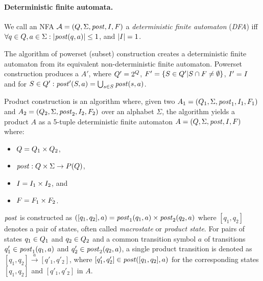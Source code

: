 
\paragraph{Deterministic finite automata.}
We call an NFA $\mathcal{A} = (Q, \Sigma
, \mathit{post}, I, F)$ a \emph{deterministic finite automaton} (\emph{DFA}) iff $\forall q \in Q, a \in \Sigma: |\mathit{post}(q, a)| \leq 1
$, and $|I| = 1$.

\begin{definition} \hfill \newline
    The algorithm of powerset (subset) construction creates a deterministic finite automaton from its equivalent non-deterministic finite automaton. Powerset construction produces a \dfa $A'$, where $Q' = 2^Q$, $F' = \{S \in Q' | S \cap F \neq \emptyset\}$, $I' = I$ and for $S \in Q': \mathit{post}'(S, a) = \bigcup_{s \in S} \mathit{post}(s, a)$.
\end{definition}

\begin{definition} \hfill \newline
Product construction is an algorithm where, given two \nfas $A_1 = (Q_1, \Sigma, \mathit{post}_1, I_1, F_1)$ and $A_2 = (Q_2, \Sigma, \mathit{post}_2, I_2, F_2)$ over an alphabet $\Sigma$, the algorithm yields a product \nfa $A$ as a 5-tuple deterministic finite automaton $A = (Q, \Sigma, \mathit{post}, I, F)$ where:
\begin{itemize}
    \item $Q = Q_1 \times Q_2$,
    \item $\mathit{post}: Q \times \Sigma \rightarrow{} P(Q)$,
    \item $I = I_1 \times I_2$, and
    \item $F = F_1 \times F_2$.
\end{itemize}
\end{definition}

$\mathit{post}$ is constructed as $([q_1, q_2], a) = \mathit{post}_1(q_1, a) \times \mathit{post}_2(q_2, a)$ where $[q_1, q_2]$ denotes a pair of states, often called \emph{macrostate} or \emph{product state}. For pairs of states $q_1 \in Q_1$ and $q_2 \in Q_2$ and a common transition symbol $a$ of transitions $q'_1 \in \mathit{post}_1(q_1, a)$ and $q'_2 \in \mathit{post}_2(q_2,a)$, a single product transition is denoted as $[q_1, q_2] \xrightarrow{a} [q'_1, q'_2]$, where $[q'_1, q'_2] \in \mathit{post}([q_1, q_2], a)$ for the corresponding states $[q_1, q_2]$ and $[q'_1, q'_2]$ in $A$.

